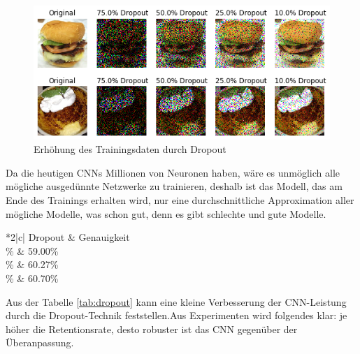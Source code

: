 \documentclass[12pt,a4paper]{scrartcl}
\numberwithin{equation}{section}
\begin{document}
	\begin{figure}[h!]
		\centering
		\includegraphics[width=\textwidth]{model}
		\caption{Erhöhung des Trainingsdaten durch Dropout}
		\label{fig:DropoutDataAugmentation}
	\end{figure}
	
Da die heutigen \acsp{CNN} Millionen von Neuronen haben, wäre es unmöglich alle mögliche ausgedünnte Netzwerke zu trainieren, deshalb ist das Modell, das am Ende des Trainings erhalten wird, nur eine durchschnittliche Approximation aller mögliche Modelle, was schon gut, denn es gibt schlechte und gute Modelle.
	\begin{table}[h!]
		\centering
		\begin{tabular}{*2{|c}|}
			\hline
			Dropout & Genauigkeit \\ \% & 59.00\% \\ \% & 60.27\% \\ \% & 60.70\% \\ \hline
		\end{tabular}
	\caption{Anwendung von Dropout Technik.}
	\label{tab:dropout}
	\end{table}

Aus der Tabelle \ref{tab:dropout} kann eine kleine Verbesserung der CNN-Leistung durch die Dropout-Technik feststellen.Aus Experimenten wird folgendes klar: je höher die Retentionsrate, desto robuster ist das CNN gegenüber der Überanpassung.

\end{document}

